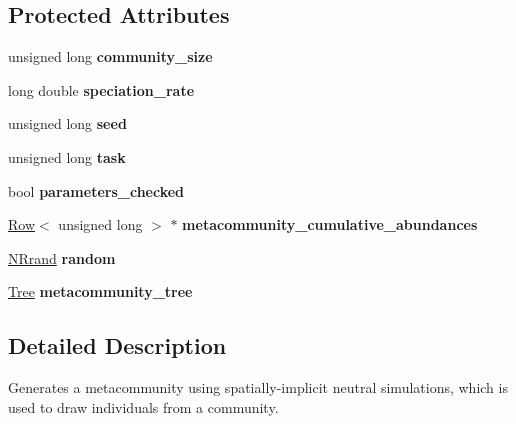 \subsection*{Protected Attributes}
\begin{DoxyCompactItemize}
\item 
unsigned long {\bfseries community\+\_\+size}\hypertarget{class_metacommunity_a3b392090e764ffb2ada3881e4eddd0b1}{}\label{class_metacommunity_a3b392090e764ffb2ada3881e4eddd0b1}

\item 
long double {\bfseries speciation\+\_\+rate}\hypertarget{class_metacommunity_aad4378b40264345fc6f5116aedc58c26}{}\label{class_metacommunity_aad4378b40264345fc6f5116aedc58c26}

\item 
unsigned long {\bfseries seed}\hypertarget{class_metacommunity_afd81750697ac8540b71de001ee53fc61}{}\label{class_metacommunity_afd81750697ac8540b71de001ee53fc61}

\item 
unsigned long {\bfseries task}\hypertarget{class_metacommunity_a094dfd2d0bb737a1f5bd06ceb3c6da1f}{}\label{class_metacommunity_a094dfd2d0bb737a1f5bd06ceb3c6da1f}

\item 
bool {\bfseries parameters\+\_\+checked}\hypertarget{class_metacommunity_a8b0ca689c1c638e49424d59fadb2e28d}{}\label{class_metacommunity_a8b0ca689c1c638e49424d59fadb2e28d}

\item 
\hyperlink{class_row}{Row}$<$ unsigned long $>$ $\ast$ {\bfseries metacommunity\+\_\+cumulative\+\_\+abundances}\hypertarget{class_metacommunity_ae9ef6b36732d3269baef697b5341c0b9}{}\label{class_metacommunity_ae9ef6b36732d3269baef697b5341c0b9}

\item 
\hyperlink{class_n_rrand}{N\+Rrand} {\bfseries random}\hypertarget{class_metacommunity_aa47b2ff3f6944143f8e734d0988d2ff3}{}\label{class_metacommunity_aa47b2ff3f6944143f8e734d0988d2ff3}

\item 
\hyperlink{class_tree}{Tree} {\bfseries metacommunity\+\_\+tree}\hypertarget{class_metacommunity_a85e91103025feb641bf0df9d02152b99}{}\label{class_metacommunity_a85e91103025feb641bf0df9d02152b99}

\end{DoxyCompactItemize}


\subsection{Detailed Description}
Generates a metacommunity using spatially-\/implicit neutral simulations, which is used to draw individuals from a community. 

